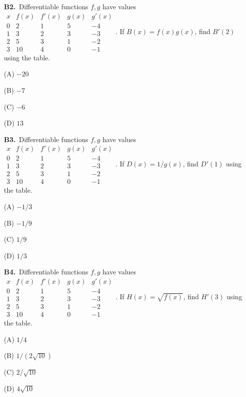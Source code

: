 \documentclass[11pt]{article}
\begin{document}
\bigskip\noindent\textbf{B2.}\ Differentiable functions $f,g$ have values $\begin{array}{c|rrrr}x&f(x)&f\prime(x)&g(x)&g\prime(x)\\0&2&1&5&-4\\1&3&2&3&-3\\2&5&3&1&-2\\3&10&4&0&-1\end{array}$. If $B(x)=f(x)g(x)$, find $B'(2)$ using the table.
\begin{list}{}{\setlength{\leftmargin}{3em}\setlength{\labelwidth}{2.5em}\setlength{\itemsep}{0pt}\setlength{\topsep}{2pt}}
\item[(A)] $-20$
\item[(B)] $-7$
\item[(C)] $-6$
\item[(D)] $13$
\end{list}

\bigskip\noindent\textbf{B3.}\ Differentiable functions $f,g$ have values $\begin{array}{c|rrrr}x&f(x)&f\prime(x)&g(x)&g\prime(x)\\0&2&1&5&-4\\1&3&2&3&-3\\2&5&3&1&-2\\3&10&4&0&-1\end{array}$. If $D(x)=1/g(x)$, find $D'(1)$ using the table.
\begin{list}{}{\setlength{\leftmargin}{3em}\setlength{\labelwidth}{2.5em}\setlength{\itemsep}{0pt}\setlength{\topsep}{2pt}}
\item[(A)] $-1/3$
\item[(B)] $-1/9$
\item[(C)] $1/9$
\item[(D)] $1/3$
\end{list}

\bigskip\noindent\textbf{B4.}\ Differentiable functions $f,g$ have values $\begin{array}{c|rrrr}x&f(x)&f\prime(x)&g(x)&g\prime(x)\\0&2&1&5&-4\\1&3&2&3&-3\\2&5&3&1&-2\\3&10&4&0&-1\end{array}$. If $H(x)=\sqrt{f(x)}$, find $H'(3)$ using the table.
\begin{list}{}{\setlength{\leftmargin}{3em}\setlength{\labelwidth}{2.5em}\setlength{\itemsep}{0pt}\setlength{\topsep}{2pt}}
\item[(A)] $1/4$
\item[(B)] $1/(2\sqrt{10})$
\item[(C)] $2/\sqrt{10}$
\item[(D)] $4\sqrt{10}$
\end{list}
\end{document}
